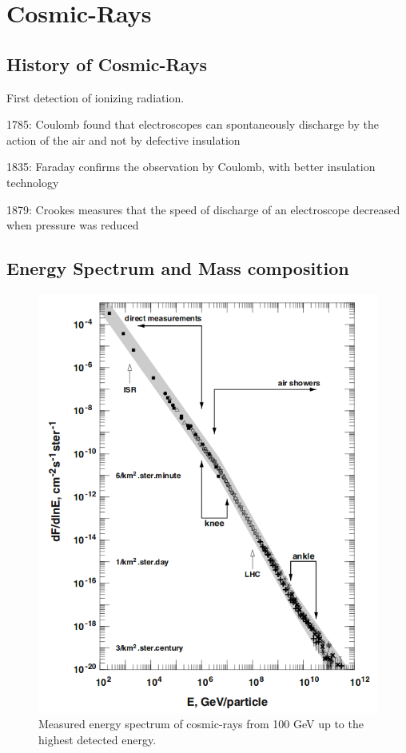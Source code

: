 \chapter[Cosmic-Rays]{\centering Cosmic-Rays \\}\label{Ch:Cosmic-rays}

\section{History of Cosmic-Rays}

First detection of ionizing radiation. 

1785: Coulomb found that 
electroscopes can spontaneously 
discharge by the action of the air 
and not by defective insulation

1835: Faraday confirms the 
observation by Coulomb, with 
better insulation technology

1879: Crookes measures that the 
speed of discharge of an 
electroscope decreased when 
pressure was reduced 

\section{Energy Spectrum and Mass composition}

\begin{figure}[hp]
\centering
\includegraphics[width=\textwidth]{chapters/pix/CosmicRay_Spectrum.png}
\caption{Measured energy spectrum of cosmic-rays from 100 GeV up to the highest detected energy.}
\label{fig:CR_Spectrum}
\end{figure}

